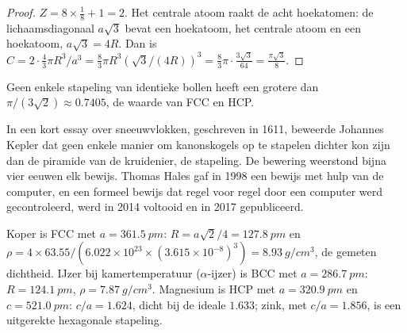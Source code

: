 \begin{proof}
$Z = 8 \times \frac18 + 1 = 2$. Het centrale atoom raakt de acht
hoekatomen: de lichaamsdiagonaal $a\sqrt3$ bevat een hoekatoom, het
centrale atoom en een hoekatoom, $a\sqrt3 = 4R$. Dan is $C = 2 \cdot \frac43\pi R^3/a^3 =
\frac83\pi R^3 (\sqrt3/(4R))^3 = \frac83\pi \cdot \frac{3\sqrt3}{64} =
\frac{\pi\sqrt3}{8}$.
\end{proof}

\begin{proposition}\label{prop:b1:crystals-metals:kepler}
Geen enkele stapeling van identieke bollen heeft een grotere 
dan $\pi/(3\sqrt2) \approx 0.7405$, de waarde van FCC en HCP.
\end{proposition}
\admitted

\begin{history}
In een kort essay over sneeuwvlokken, geschreven in 1611, beweerde
Johannes Kepler dat geen enkele manier om kanonskogels op te stapelen
dichter kon zijn dan de piramide van de kruidenier, de  stapeling. De bewering weerstond bijna vier eeuwen elk
bewijs. Thomas Hales gaf in 1998 een bewijs met hulp van de computer, en
een formeel bewijs dat regel voor regel door een computer werd
gecontroleerd, werd in 2014 voltooid en in 2017 gepubliceerd.
\end{history}

\begin{example}\label{ex:b1:crystals-metals:metals}
Koper is FCC met $a = \qty{361.5}{pm}$: $R = a\sqrt2/4 =
\qty{127.8}{pm}$ en $\rho = 4 \times 63.55/(6.022 \times 10^{23} \times
(3.615 \times 10^{-8})^3) = \qty{8.93}{g/cm^3}$, de gemeten dichtheid.
IJzer bij kamertemperatuur ($\alpha$-ijzer) is BCC met
$a = \qty{286.7}{pm}$: $R = \qty{124.1}{pm}$, $\rho = \qty{7.87}{g/cm^3}$.
Magnesium is HCP met $a = \qty{320.9}{pm}$ en $c = \qty{521.0}{pm}$:
$c/a = 1.624$, dicht bij de ideale $1.633$; zink, met $c/a = 1.856$, is
een uitgerekte hexagonale stapeling.
\end{example}

